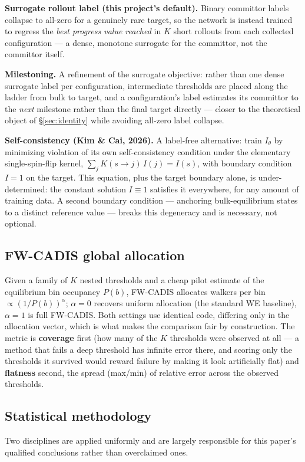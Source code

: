\documentclass[a4paper,fleqn]{cas-sc}
\begin{document}
\textbf{Surrogate rollout label (this project's default).} Binary committor labels collapse
to all-zero for a genuinely rare target, so the network is instead trained to regress the
\emph{best progress value reached} in $K$ short rollouts from each collected configuration
--- a dense, monotone surrogate for the committor, not the committor itself.

\textbf{Milestoning.} A refinement of the surrogate objective: rather than one dense
surrogate label per configuration, intermediate thresholds are placed along the ladder from
bulk to target, and a configuration's label estimates its committor to the \emph{next}
milestone rather than the final target directly --- closer to the theoretical object of
\S\ref{sec:identity} while avoiding all-zero label collapse.

\textbf{Self-consistency (Kim \& Cai, 2026).} A label-free alternative: train $I_\theta$ by
minimizing violation of its own self-consistency condition under the elementary
single-spin-flip kernel, $\sum_j K(s\to j)\,I(j)=I(s)$, with boundary condition $I=1$ on the
target. This equation, plus the target boundary alone, is under-determined: the constant
solution $I\equiv1$ satisfies it everywhere, for any amount of training data. A second
boundary condition --- anchoring bulk-equilibrium states to a distinct reference value ---
breaks this degeneracy and is necessary, not optional.

\subsection{FW-CADIS global allocation}
Given a family of $K$ nested thresholds and a cheap pilot estimate of the equilibrium bin
occupancy $P(b)$, FW-CADIS allocates walkers per bin $\propto (1/P(b))^\alpha$; $\alpha=0$
recovers uniform allocation (the standard WE baseline), $\alpha=1$ is full FW-CADIS. Both
settings use identical code, differing only in the allocation vector, which is what makes
the comparison fair by construction. The metric is \textbf{coverage} first (how many of the
$K$ thresholds were observed at all --- a method that fails a deep threshold has infinite
error there, and scoring only the thresholds it survived would reward failure by making it
look artificially flat) and \textbf{flatness} second, the spread (max/min) of relative error
across the observed thresholds.

\subsection{Statistical methodology}
Two disciplines are applied uniformly and are largely responsible for this paper's
qualified conclusions rather than overclaimed ones.
\end{document}
